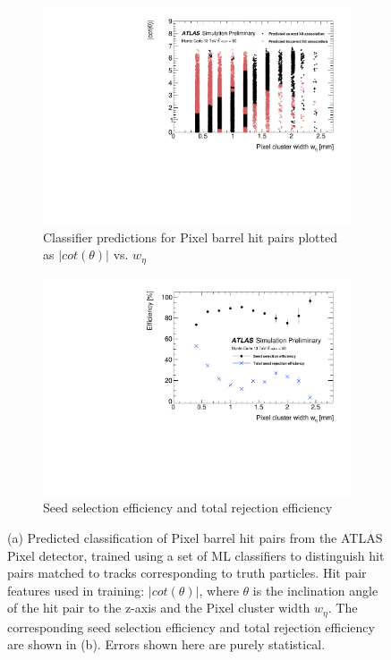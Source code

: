 \begin{figure}[!htbp]
\centering
    \begin{subfigure}[a]{0.91\textwidth}
        \includegraphics[width=\linewidth]{images/4-ml-based-predictor/scatter_kde_predictions.pdf}
        \caption{Classifier predictions for Pixel barrel hit pairs plotted as $\lvert cot(\theta) \rvert$ vs. $w_{\eta}$}
        \label{fig:predictions-pb-2d}
    \end{subfigure}
    \hfill
    \begin{subfigure}[b]{0.91\textwidth}
        \centering
        \includegraphics[width=\linewidth]{images/4-ml-based-predictor/triplet_eff_metrics.pdf}
        \caption{Seed selection efficiency and total rejection efficiency}
    \end{subfigure}
\caption{(a) Predicted classification of Pixel barrel hit pairs from the ATLAS Pixel detector, trained using a set of ML classifiers to distinguish hit pairs matched to tracks corresponding to truth particles. Hit pair features used in training: $\lvert cot(\theta) \rvert$, where $\theta$ is the inclination angle of the hit pair to the z-axis and the Pixel cluster width $w_{\eta}$. The corresponding seed selection efficiency and total rejection efficiency are shown in (b). Errors shown here are purely statistical.}
\label{fig:predictions-pixel-barrel-and-triplet-efficiencies}
\end{figure}



